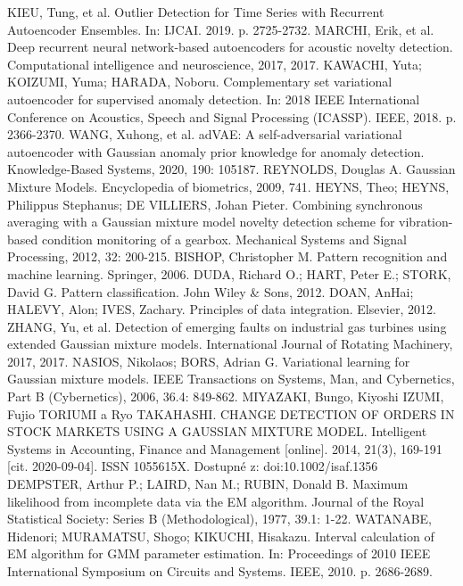 \documentclass[11pt,twoside,openright]{report}
\begin{document}
\begin{thebibliography}{L}
KIEU, Tung, et al. Outlier Detection for Time Series with Recurrent Autoencoder Ensembles. In: IJCAI. 2019. p. 2725-2732.
MARCHI, Erik, et al. Deep recurrent neural network-based autoencoders for acoustic novelty detection. Computational intelligence and neuroscience, 2017, 2017.
KAWACHI, Yuta; KOIZUMI, Yuma; HARADA, Noboru. Complementary set variational autoencoder for supervised anomaly detection. In: 2018 IEEE International Conference on Acoustics, Speech and Signal Processing (ICASSP). IEEE, 2018. p. 2366-2370.
WANG, Xuhong, et al. adVAE: A self-adversarial variational autoencoder with Gaussian anomaly prior knowledge for anomaly detection. Knowledge-Based Systems, 2020, 190: 105187.
REYNOLDS, Douglas A. Gaussian Mixture Models. Encyclopedia of biometrics, 2009, 741.
HEYNS, Theo; HEYNS, Philippus Stephanus; DE VILLIERS, Johan Pieter. Combining synchronous averaging with a Gaussian mixture model novelty detection scheme for vibration-based condition monitoring of a gearbox. Mechanical Systems and Signal Processing, 2012, 32: 200-215.
BISHOP, Christopher M. Pattern recognition and machine learning. Springer, 2006.
DUDA, Richard O.; HART, Peter E.; STORK, David G. Pattern classification. John Wiley & Sons, 2012.
DOAN, AnHai; HALEVY, Alon; IVES, Zachary. Principles of data integration. Elsevier, 2012.
ZHANG, Yu, et al. Detection of emerging faults on industrial gas turbines using extended Gaussian mixture models. International Journal of Rotating Machinery, 2017, 2017.
NASIOS, Nikolaos; BORS, Adrian G. Variational learning for Gaussian mixture models. IEEE Transactions on Systems, Man, and Cybernetics, Part B (Cybernetics), 2006, 36.4: 849-862.
MIYAZAKI, Bungo, Kiyoshi IZUMI, Fujio TORIUMI a Ryo TAKAHASHI. CHANGE DETECTION OF ORDERS IN STOCK MARKETS USING A GAUSSIAN MIXTURE MODEL. Intelligent Systems in Accounting, Finance and Management [online]. 2014, 21(3), 169-191 [cit. 2020-09-04]. ISSN 1055615X. Dostupné z: doi:10.1002/isaf.1356
DEMPSTER, Arthur P.; LAIRD, Nan M.; RUBIN, Donald B. Maximum likelihood from incomplete data via the EM algorithm. Journal of the Royal Statistical Society: Series B (Methodological), 1977, 39.1: 1-22.
WATANABE, Hidenori; MURAMATSU, Shogo; KIKUCHI, Hisakazu. Interval calculation of EM algorithm for GMM parameter estimation. In: Proceedings of 2010 IEEE International Symposium on Circuits and Systems. IEEE, 2010. p. 2686-2689.

\end{thebibliography}
\end{document}
